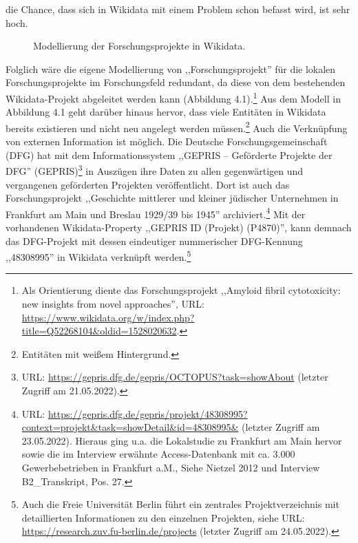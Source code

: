 die Chance, dass sich in Wikidata mit einem Problem schon befasst wird, ist sehr hoch.

\begin{figure}[h]
    \centering
    \caption{Modellierung der Forschungsprojekte in Wikidata.}
    \label{fig:x cubed graph} 
\end{figure}

Folglich wäre die eigene Modellierung von ,,Forschungsprojekt'' für die lokalen Forschungsprojekte im Forschungsfeld redundant, da diese von dem bestehenden Wikidata-Projekt abgeleitet werden kann (Abbildung 4.1).\footnote{Als Orientierung diente das Forschungsprojekt ,,Amyloid fibril cytotoxicity: new insights from novel approaches'', URL: \url{https://www.wikidata.org/w/index.php?title=Q52268104&oldid=1528020632}.} Aus dem Modell in Abbildung 4.1 geht darüber hinaus hervor, dass viele Entitäten in Wikidata bereits existieren und nicht neu angelegt werden müssen.\footnote{Entitäten mit weißem Hintergrund.} Auch die Verknüpfung von externen Information ist möglich. Die Deutsche Forschungsgemeinschaft (DFG) hat mit dem Informationssystem ,,GEPRIS – Geförderte Projekte der DFG'' (GEPRIS)\footnote{URL: \url{https://gepris.dfg.de/gepris/OCTOPUS?task=showAbout} (letzter Zugriff am 21.05.2022).} in Auszügen ihre Daten zu allen gegenwärtigen und vergangenen geförderten Projekten veröffentlicht. Dort ist auch das Forschungsprojekt ,,Geschichte mittlerer und kleiner jüdischer Unternehmen in Frankfurt am Main und Breslau 1929/39 bis 1945'' archiviert.\footnote{URL: \url{https://gepris.dfg.de/gepris/projekt/48308995?context=projekt&task=showDetail&id=48308995&} (letzter Zugriff am 23.05.2022). Hieraus ging u.a. die Lokalstudie zu Frankfurt am Main hervor sowie die im Interview erwähnte Access-Datenbank mit ca. 3.000 Gewerbebetrieben in Frankfurt a.M., Siehe Nietzel 2012 und Interview B2\_Transkript, Pos. 27.} Mit der vorhandenen Wikidata-Property ,,GEPRIS ID (Projekt) (P4870)'', kann demnach das DFG-Projekt mit dessen eindeutiger nummerischer DFG-Kennung ,,48308995'' in Wikidata verknüpft werden.\footnote{Auch die Freie Universität Berlin führt ein zentrales Projektverzeichnis mit detaillierten Informationen zu den einzelnen Projekten, siehe URL: \url{https://research.zuv.fu-berlin.de/projects} (letzter Zugriff am 24.05.2022).}  

